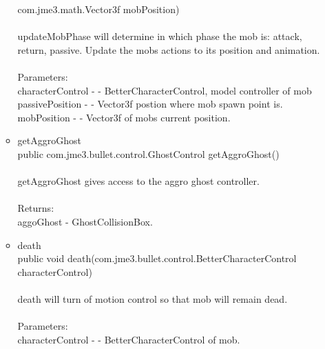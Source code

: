 \documentclass[letterpaper]{article}
\begin{document}
\begin{itemize}
\begin{itemize}
													com.jme3.math.Vector3f mobPosition) \\ \\
													updateMobPhase will determine in which phase the mob is: attack, return, passive. Update the mobs actions to its position and animation. \\ \\
													Parameters: \\
													characterControl - - BetterCharacterControl, model controller of mob
													passivePosition - - Vector3f postion where mob spawn point is. \\
													mobPosition - - Vector3f of mobs current position.
											\item	getAggroGhost \\
													public com.jme3.bullet.control.GhostControl getAggroGhost() \\ \\
													getAggroGhost gives access to the aggro ghost controller. \\ \\
													Returns: \\
													aggoGhost - GhostCollisionBox. \\
											\item	death \\
													public void death(com.jme3.bullet.control.BetterCharacterControl characterControl) \\ \\
													death will turn of motion control so that mob will remain dead. \\ \\
													Parameters: \\
													characterControl - - BetterCharacterControl of mob. \\
										\end{itemize}
							\end{itemize}
							
							\vspace{0.2in}
\end{document}
